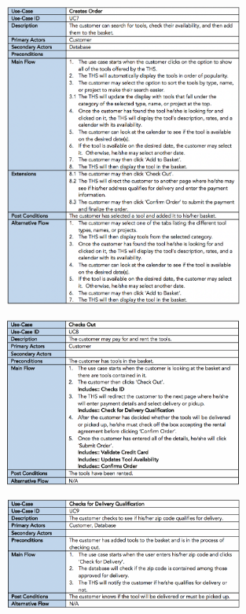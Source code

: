 \begin{figure}[H]
      \centering
      \includegraphics[trim = 0 0 0 0, clip, width=0.7\textwidth]{TempImg/UC7.png}
 \end{figure}

\begin{figure}[H]
      \centering
      \includegraphics[trim = 0 0 0 0, clip, width=0.7\textwidth]{TempImg/UC8.png}
 \end{figure}

\begin{figure}[H]
      \centering
      \includegraphics[trim = 0 0 0 0, clip, width=0.7\textwidth]{TempImg/UC9.png}
 \end{figure}

